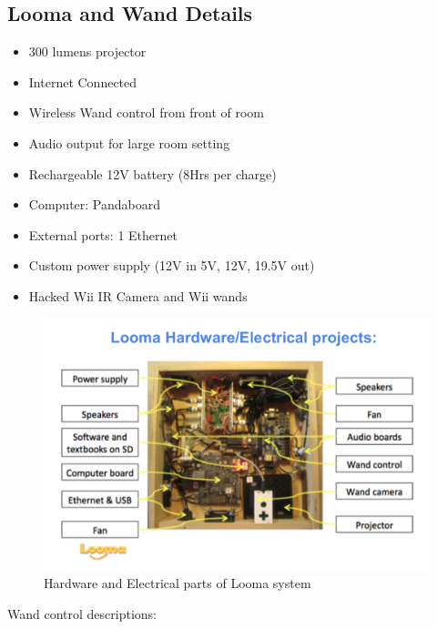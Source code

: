 \documentclass[12pt, a4paper]{article}
\begin{document}
\subsection{Looma and Wand Details}
\begin{itemize}
\item300 lumens projector
\item Internet Connected 
\item Wireless Wand control from front of room
\item Audio output for large room setting
\item Rechargeable 12V battery (8Hrs per charge)
\item Computer: Pandaboard
\item External ports: 1 Ethernet
\item Custom power supply (12V in 5V, 12V, 19.5V out)
\item Hacked Wii IR Camera and Wii wands
\end{itemize}
\begin{figure}[htp]
\centering
\includegraphics[scale=0.22]{looma.png}
\caption{Hardware and Electrical parts of Looma system}
\label{}
\end{figure}
\newpage
Wand control descriptions:
\end{document}
